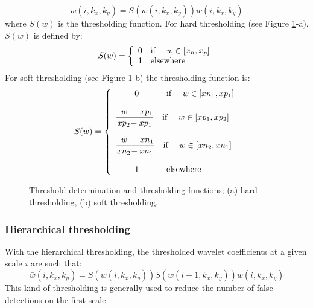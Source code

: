 \begin{itemize}
\begin{equation}
\bar w(i,k_x,k_y) = S(w(i,k_x,k_y)) w(i,k_x,k_y) 
\end{equation}
where  $S(w)$ is the thresholding function. For hard thresholding 
 (see Figure \ref{fig:seuil}-a), $S(w)$ is defined by:
\begin{eqnarray}
S(w) =
\left\lbrace
\begin{array}{l}
 0 \quad \mbox{if \quad} w \in [x_n, x_p]\\
 1 \quad \mbox{elsewhere}
\end{array}
\right.
\end{eqnarray}
For soft thresholding (see Figure \ref{fig:seuil}-b) the thresholding 
function is:
\begin{eqnarray}
S(w) =
\left\lbrace
\begin{array}{l}
\hspace*{0.8truecm} 0 \quad  \mbox{\hspace*{0.8truecm}if \quad}  w \in [xn_1, xp_1] \\
\\
{\displaystyle { \frac{\; \; w \; -xp_1} {xp_2 \! - xp_1}}} \quad \mbox{if \quad} w \in [xp_1, xp_2]\\
\\
{\displaystyle { \frac{\; \; w \; -xn_1} {xn_2 \! - xn_1}}} \quad \mbox{if \quad} w \in [xn_2, xn_1]\\
\\
\hspace*{0.8truecm} 1 \quad \mbox{\hspace*{0.8truecm}elsewhere}\\
\end{array}
\right.
\label{eq:fonction_seuillage_ponderee}
\end{eqnarray}

\begin{figure}[htb]
\centerline{
\hbox{}}
\caption{Threshold determination and thresholding functions; 
(a) hard thresholding, (b) soft thresholding.}
\label{fig:seuil}
\end{figure} 

\subsubsection{Hierarchical thresholding}
With the hierarchical thresholding,  the thresholded wavelet
 coefficients at a given scale $i$  are such that: 
\begin{equation}
\bar w(i,k_x,k_y) = S(w(i,k_x,k_y)) S(w(i+1,k_x,k_y)) w(i,k_x,k_y) 
\end{equation}
This kind of thresholding is generally used  to reduce the number
 of false detections on the first scale.


\end{itemize}
